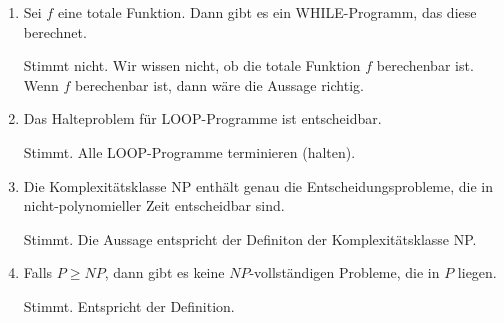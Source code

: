 \documentclass{lehramt-informatik-aufgabe}
\begin{document}
\begin{enumerate}

\item Sei $f$ eine totale Funktion. Dann gibt es ein WHILE-Programm, das
diese berechnet.

\begin{liAntwort}
Stimmt nicht. Wir wissen nicht, ob die totale Funktion $f$ berechenbar
ist. Wenn $f$ berechenbar ist, dann wäre die Aussage richtig.
\end{liAntwort}


\item Das Halteproblem für LOOP-Programme ist entscheidbar.

\begin{liAntwort}
Stimmt. Alle LOOP-Programme terminieren (halten).
\end{liAntwort}


\item Die Komplexitätsklasse NP enthält genau die Entscheidungsprobleme,
die in nicht-polynomieller Zeit entscheidbar sind.

\begin{liAntwort}
Stimmt. Die Aussage entspricht der Definiton der Komplexitätsklasse NP.
\end{liAntwort}


\item Falls $P \geq NP$, dann gibt es keine $NP$-vollständigen Probleme,
die in $P$ liegen.

\begin{liAntwort}
Stimmt. Entspricht der Definition.
\end{liAntwort}
\end{enumerate}
\end{document}
